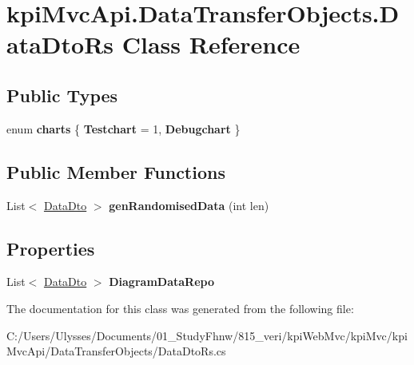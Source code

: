 \hypertarget{classkpi_mvc_api_1_1_data_transfer_objects_1_1_data_dto_rs}{}\section{kpi\+Mvc\+Api.\+Data\+Transfer\+Objects.\+Data\+Dto\+Rs Class Reference}
\label{classkpi_mvc_api_1_1_data_transfer_objects_1_1_data_dto_rs}
\subsection*{Public Types}
\begin{DoxyCompactItemize}
\item 
\mbox{\label{classkpi_mvc_api_1_1_data_transfer_objects_1_1_data_dto_rs_aecf9c69f6b3af50496d6a76b2dee5ed7}} 
enum {\bfseries charts} \{ {\bfseries Testchart} = 1, 
{\bfseries Debugchart}
 \}
\end{DoxyCompactItemize}
\subsection*{Public Member Functions}
\begin{DoxyCompactItemize}
\item 
\mbox{\label{classkpi_mvc_api_1_1_data_transfer_objects_1_1_data_dto_rs_a4bdde2ef606e22ffa376704b34af25f1}} 
List$<$ \hyperlink{classkpi_mvc_api_1_1_data_transfer_objects_1_1_data_dto}{Data\+Dto} $>$ {\bfseries gen\+Randomised\+Data} (int len)
\end{DoxyCompactItemize}
\subsection*{Properties}
\begin{DoxyCompactItemize}
\item 
\mbox{\label{classkpi_mvc_api_1_1_data_transfer_objects_1_1_data_dto_rs_a4640716b6ad2e4497992e3ab09c4c50c}} 
List$<$ \hyperlink{classkpi_mvc_api_1_1_data_transfer_objects_1_1_data_dto}{Data\+Dto} $>$ {\bfseries Diagram\+Data\+Repo}
\end{DoxyCompactItemize}


The documentation for this class was generated from the following file\+:\begin{DoxyCompactItemize}
\item 
C\+:/\+Users/\+Ulysses/\+Documents/01\+\_\+\+Study\+Fhnw/815\+\_\+veri/kpi\+Web\+Mvc/kpi\+Mvc/kpi\+Mvc\+Api/\+Data\+Transfer\+Objects/Data\+Dto\+Rs.\+cs\end{DoxyCompactItemize}
